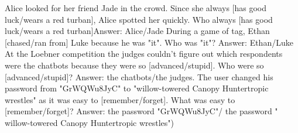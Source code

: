 \begin{foo}
Alice looked for her friend Jade in the crowd. Since she always [has good luck/wears a red turban], Alice spotted her quickly. Who always [has good luck/wears a red turban]Answer: Alice/Jade
During a game of tag, Ethan [chased/ran from] Luke because he was "it". Who was "it"? Answer: Ethan/Luke
At the Loebner competition the judges couldn't figure out which respondents were the chatbots because they were so [advanced/stupid]. Who were so [advanced/stupid]? Answer: the chatbots/the judges.
The user changed his password from "GrWQWu8JyC" to "willow-towered Canopy Huntertropic wrestles" as it was easy to [remember/forget]. What was easy to [remember/forget]? Answer: the password  "GrWQWu8JyC"/ the password  " willow-towered Canopy Huntertropic wrestles") \end{foo}

